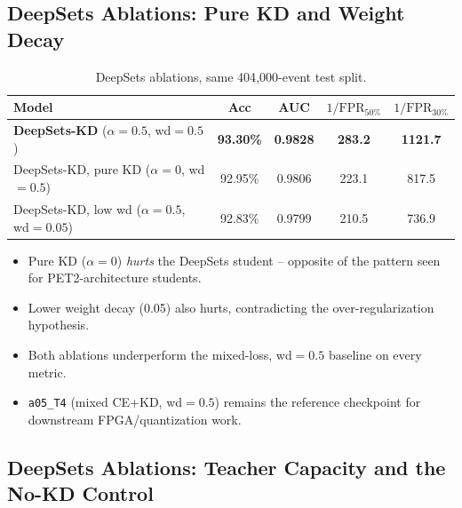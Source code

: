 \subsection{DeepSets Ablations: Pure KD and Weight Decay}
\label{sec:deepsets-ablations}

\begin{table}[h]
    \centering
    \small
    \begin{tabular}{lcccc}
        \toprule
        Model & Acc & AUC & $1/\mathrm{FPR}_{50\%}$ & $1/\mathrm{FPR}_{30\%}$ \\
        \midrule
        \textbf{DeepSets-KD} ($\alpha{=}0.5$, wd$=0.5$) & \textbf{93.30\%} & \textbf{0.9828} & \textbf{283.2} & \textbf{1121.7} \\
        DeepSets-KD, pure KD ($\alpha{=}0$, wd$=0.5$)   & 92.95\% & 0.9806 & 223.1 & 817.5 \\
        DeepSets-KD, low wd ($\alpha{=}0.5$, wd$=0.05$) & 92.83\% & 0.9799 & 210.5 & 736.9 \\
        \bottomrule
    \end{tabular}
    \caption{DeepSets ablations, same 404{,}000-event test split.}
    \label{tab:deepsets-ablations}
\end{table}

\begin{itemize}
    \item Pure KD ($\alpha{=}0$) \emph{hurts} the DeepSets student --
    opposite of the pattern seen for PET2-architecture students.
    \item Lower weight decay (0.05) also hurts, contradicting the
    over-regularization hypothesis.
    \item Both ablations underperform the mixed-loss, wd$=0.5$ baseline on
    every metric.
    \item \texttt{a05\_T4} (mixed CE+KD, wd$=0.5$) remains the reference
    checkpoint for downstream FPGA/quantization work.
\end{itemize}

\subsection{DeepSets Ablations: Teacher Capacity and the No-KD Control}
\label{sec:deepsets-teacher-ablation}

